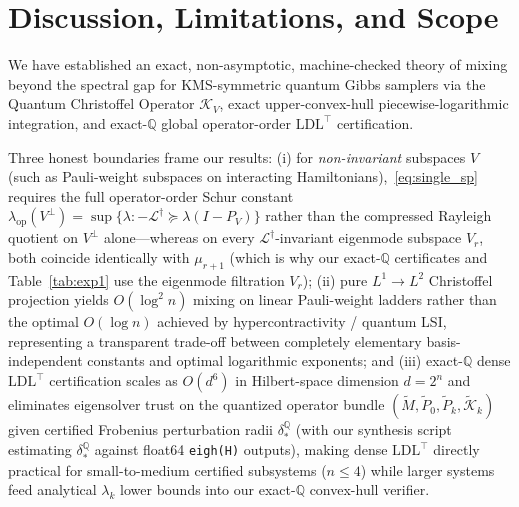 \documentclass[11pt,a4paper]{article}
\theoremstyle{definition}
\newcommand{\Q}{\mathbb{Q}}
\newcommand{\Kchr}{\mathcal{K}}
\begin{document}
\section{Discussion, Limitations, and Scope}
\label{sec:discussion}

We have established an exact, non-asymptotic, machine-checked theory of mixing beyond the spectral gap for KMS-symmetric quantum Gibbs samplers via the Quantum Christoffel Operator $\Kchr_V$, exact upper-convex-hull piecewise-logarithmic integration, and exact-$\Q$ global operator-order $\mathrm{LDL}^\top$ certification.

Three honest boundaries frame our results: (i) for \emph{non-invariant} subspaces $V$ (such as Pauli-weight subspaces on interacting Hamiltonians),~\eqref{eq:single_sp} requires the full operator-order Schur constant $\lambda_{\mathrm{op}}(V^\perp) = \sup\{\lambda : -\mathcal{L}^\dagger \succeq \lambda(I - P_V)\}$ rather than the compressed Rayleigh quotient on $V^\perp$ alone—whereas on every $\mathcal{L}^\dagger$-invariant eigenmode subspace $V_r$, both coincide identically with $\mu_{r+1}$ (which is why our exact-$\Q$ certificates and Table~\ref{tab:exp1} use the eigenmode filtration $V_r$); (ii) pure $L^1 \to L^2$ Christoffel projection yields $O(\log^2 n)$ mixing on linear Pauli-weight ladders rather than the optimal $O(\log n)$ achieved by hypercontractivity / quantum LSI, representing a transparent trade-off between completely elementary basis-independent constants and optimal logarithmic exponents; and (iii) exact-$\Q$ dense $\mathrm{LDL}^\top$ certification scales as $O(d^6)$ in Hilbert-space dimension $d = 2^n$ and eliminates eigensolver trust on the quantized operator bundle $(\tilde{M}, \tilde{P}_0, \tilde{P}_k, \tilde{\Kchr}_k)$ given certified Frobenius perturbation radii $\delta_*^{\Q}$ (with our synthesis script estimating $\delta_*^{\Q}$ against float64 \texttt{eigh(H)} outputs), making dense $\mathrm{LDL}^\top$ directly practical for small-to-medium certified subsystems ($n \le 4$) while larger systems feed analytical $\lambda_k$ lower bounds into our exact-$\Q$ convex-hull verifier.



\end{document}
